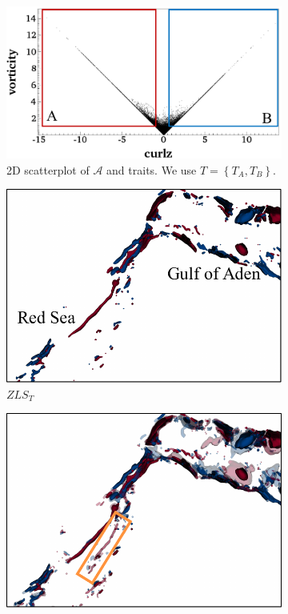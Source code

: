 \begin{figure}[!h]
\begin{subfigure}{0.24\linewidth}
\centering
\includegraphics[width=0.95\linewidth]{Images/RedSeaEddy/scatterplot.pdf}
\vspace{-2mm}
\caption{2D scatterplot of $\mathcal{A}$ and traits. We use $T = \left\{T_{A}, T_{B}\right\}$.} 
\label{fig:rse_scatterplot}
\end{subfigure}
\hfill
\begin{subfigure}{0.245\linewidth}
\centering
\includegraphics[width=\linewidth]{Images/RedSeaEddy/zls.pdf}
\vspace{-3mm}
\caption{$ZLS_{T}$}
\label{fig:rse_zls}
\end{subfigure}
\begin{subfigure}{0.245\linewidth}
\centering
\includegraphics[width=\linewidth]{Images/RedSeaEddy/fcls_50.pdf}

\end{subfigure}
\end{figure}
